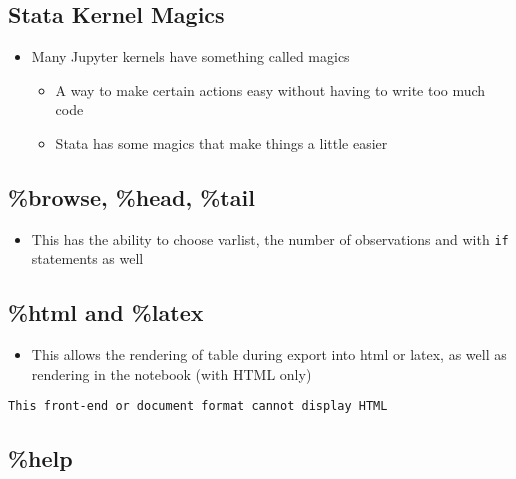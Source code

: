 \documentclass[10pt,parskip=half,
	toc=sectionentrywithdots,
	bibliography=totocnumbered,
	captions=tableheading,numbers=noendperiod]{scrartcl}
\providecommand{\tightlist}{%
  \setlength{\itemsep}{0pt}\setlength{\parskip}{0pt}}
\begin{document}
\hypertarget{stata-kernel-magics}{%
\subsection{Stata Kernel Magics}\label{stata-kernel-magics}}

\begin{itemize}
\tightlist
\item
  Many Jupyter kernels have something called magics

  \begin{itemize}
  \tightlist
  \item
    A way to make certain actions easy without having to write too much
    code
  \item
    Stata has some magics that make things a little easier
  \end{itemize}
\end{itemize}

\hypertarget{browse-head-tail}{%
\subsection{\%browse, \%head, \%tail}\label{browse-head-tail}}

\begin{itemize}
\tightlist
\item
  This has the ability to choose varlist, the number of observations and
  with \texttt{if} statements as well
\end{itemize}

\hypertarget{html-and-latex}{%
\subsection{\%html and \%latex}\label{html-and-latex}}

\begin{itemize}
\tightlist
\item
  This allows the rendering of table during export into html or latex,
  as well as rendering in the notebook (with HTML only)
\end{itemize}

\begin{lstlisting}[language={},postbreak={},numbers=none,xrightmargin=7pt,breakindent=0pt,aboveskip=5pt,belowskip=5pt]
This front-end or document format cannot display HTML
\end{lstlisting}

\hypertarget{help}{%
\subsection{\%help}\label{help}}
\end{document}
